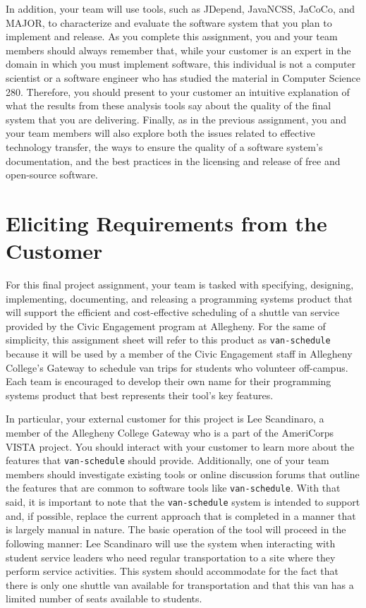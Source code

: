 In addition, your team will use tools, such as JDepend, JavaNCSS, JaCoCo, and MAJOR, to characterize and evaluate the
software system that you plan to implement and release.  As you complete this assignment, you and your team members
should always remember that, while your customer is an expert in the domain in which you must implement software, this
individual is not a computer scientist or a software engineer who has studied the material in Computer Science 280.
Therefore, you should present to your customer an intuitive explanation of what the results from these analysis tools
say about the quality of the final system that you are delivering.  Finally, as in the previous assignment, you and your
team members will also explore both the issues related to effective technology transfer, the ways to ensure the quality
of a software system's documentation, and the best practices in the licensing and release of free and open-source
software.

\section*{Eliciting Requirements from the Customer}

For this final project assignment, your team is tasked with specifying, designing, implementing, documenting, and
releasing a programming systems product that will support the efficient and cost-effective scheduling of a shuttle van
service provided by the Civic Engagement program at Allegheny.  For the same of simplicity, this assignment sheet will
refer to this product as {\tt van-schedule} because it will be used by a member of the Civic Engagement staff in
Allegheny College's Gateway to schedule van trips for students who volunteer off-campus. Each team is encouraged to
develop their own name for their programming systems product that best represents their tool's key features.


In particular, your external customer for this project is Lee Scandinaro, a member of the Allegheny College Gateway who
is a part of the AmeriCorps VISTA project. You should interact with your customer to learn more about the features that
{\tt van-schedule} should provide.  Additionally, one of your team members should investigate existing tools or online
discussion forums that outline the features that are common to software tools like {\tt van-schedule}. With that said,
it is important to note that the {\tt van-schedule} system is intended to support and, if possible, replace the current
approach that is completed in a manner that is largely manual in nature.  The basic operation of the tool will proceed in
the following manner: Lee Scandinaro will use the system when interacting with student service leaders who need regular
transportation to a site where they perform service activities. This system should accommodate for the fact that there
is only one shuttle van available for transportation and that this van has a limited number of seats available to
students.

